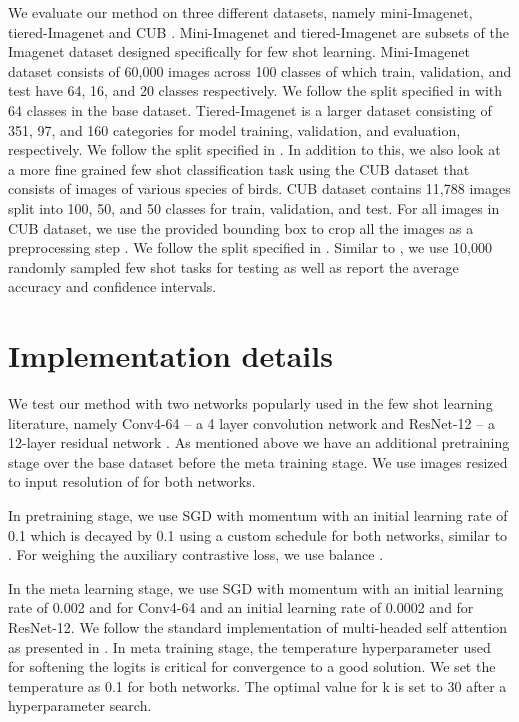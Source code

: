 \documentclass{bmvc2k}
\begin{document}
We evaluate our method on three different datasets, namely mini-Imagenet, tiered-Imagenet and CUB \cite{welinder2010caltech}. Mini-Imagenet and tiered-Imagenet are subsets of the Imagenet dataset designed specifically for few shot learning. Mini-Imagenet dataset consists of 60,000 images across 100 classes of which train, validation, and test have 64, 16, and 20 classes respectively. We follow the split specified in \cite{ravi2017optimization}  with 64 classes in the base dataset. Tiered-Imagenet is a larger dataset consisting of 351, 97, and 160 categories for model training, validation, and evaluation, respectively. We follow the split specified in \cite{ye2020few}. In addition to this, we also look at a more fine grained few shot classification task using the CUB dataset that consists of images of various species of birds. CUB dataset contains 11,788 images split into 100, 50, and 50  classes for train, validation, and test. For all images in CUB dataset, we use the provided bounding box to crop all the images as a preprocessing step \cite{triantafillou2017few}. We follow the split specified in \cite{ye2020few}.
 Similar to \cite{ye2020few, rusu2018metalearning}, we use 10,000 randomly sampled few shot tasks for testing as well as report the average accuracy and  confidence intervals.

\section{Implementation details}

We test our method with two networks popularly used in the few shot learning literature, namely Conv4-64 -- a 4 layer convolution network \cite{vinyals2016matching,snell2017prototypical,triantafillou2017few,ye2020few} and ResNet-12 -- a 12-layer residual network \cite{lee2019meta,ye2020few}. As mentioned above we have an additional pretraining stage over the base dataset before the meta training stage. We use images resized to input resolution of  for both networks. 


In pretraining stage, we use SGD with momentum with an initial learning rate of 0.1 which is decayed by 0.1 using a custom schedule for both networks, similar to \cite{ye2020few}. For weighing the auxiliary contrastive loss, we use balance . 

In the meta learning stage, we use SGD with momentum with an initial learning rate of 0.002 and  for Conv4-64 and an initial learning rate of 0.0002 and  for ResNet-12. We follow the standard implementation of multi-headed self attention as presented in \cite{vaswani2017attention}. In meta training stage, the temperature hyperparameter used for softening the logits is critical for convergence to a good solution. We set the temperature as 0.1 for both networks. The optimal value for k is set to 30 after a hyperparameter search.
\end{document}
